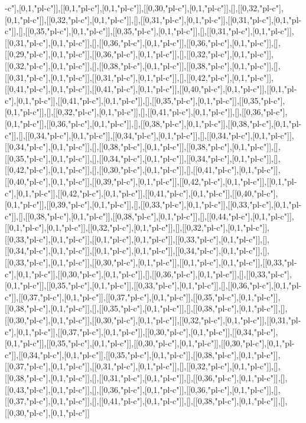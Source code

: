 -c"],[0,1,"pl-c"]],[[0,1,"pl-c"],[0,1,"pl-c"]],[[0,30,"pl-c"],[0,1,"pl-c"]],[],[[0,32,"pl-c"],[0,1,"pl-c"]],[[0,32,"pl-c"],[0,1,"pl-c"]],[],[[0,31,"pl-c"],[0,1,"pl-c"]],[[0,31,"pl-c"],[0,1,"pl-c"]],[],[[0,35,"pl-c"],[0,1,"pl-c"]],[[0,35,"pl-c"],[0,1,"pl-c"]],[],[[0,31,"pl-c"],[0,1,"pl-c"]],[[0,31,"pl-c"],[0,1,"pl-c"]],[],[[0,36,"pl-c"],[0,1,"pl-c"]],[[0,36,"pl-c"],[0,1,"pl-c"]],[],[[0,29,"pl-c"],[0,1,"pl-c"]],[[0,36,"pl-c"],[0,1,"pl-c"]],[],[[0,32,"pl-c"],[0,1,"pl-c"]],[[0,32,"pl-c"],[0,1,"pl-c"]],[],[[0,38,"pl-c"],[0,1,"pl-c"]],[[0,38,"pl-c"],[0,1,"pl-c"]],[],[[0,31,"pl-c"],[0,1,"pl-c"]],[[0,31,"pl-c"],[0,1,"pl-c"]],[],[[0,42,"pl-c"],[0,1,"pl-c"]],[[0,41,"pl-c"],[0,1,"pl-c"]],[[0,41,"pl-c"],[0,1,"pl-c"]],[[0,40,"pl-c"],[0,1,"pl-c"]],[[0,1,"pl-c"],[0,1,"pl-c"]],[[0,41,"pl-c"],[0,1,"pl-c"]],[],[[0,35,"pl-c"],[0,1,"pl-c"]],[[0,35,"pl-c"],[0,1,"pl-c"]],[],[[0,32,"pl-c"],[0,1,"pl-c"]],[],[[0,41,"pl-c"],[0,1,"pl-c"]],[],[[0,36,"pl-c"],[0,1,"pl-c"]],[[0,36,"pl-c"],[0,1,"pl-c"]],[],[[0,38,"pl-c"],[0,1,"pl-c"]],[[0,38,"pl-c"],[0,1,"pl-c"]],[],[[0,34,"pl-c"],[0,1,"pl-c"]],[[0,34,"pl-c"],[0,1,"pl-c"]],[],[[0,34,"pl-c"],[0,1,"pl-c"]],[[0,34,"pl-c"],[0,1,"pl-c"]],[],[[0,38,"pl-c"],[0,1,"pl-c"]],[[0,38,"pl-c"],[0,1,"pl-c"]],[],[[0,35,"pl-c"],[0,1,"pl-c"]],[],[[0,34,"pl-c"],[0,1,"pl-c"]],[[0,34,"pl-c"],[0,1,"pl-c"]],[],[[0,42,"pl-c"],[0,1,"pl-c"]],[],[[0,30,"pl-c"],[0,1,"pl-c"]],[],[[0,41,"pl-c"],[0,1,"pl-c"]],[[0,40,"pl-c"],[0,1,"pl-c"]],[[0,39,"pl-c"],[0,1,"pl-c"]],[[0,42,"pl-c"],[0,1,"pl-c"]],[[0,1,"pl-c"],[0,1,"pl-c"]],[[0,42,"pl-c"],[0,1,"pl-c"]],[[0,41,"pl-c"],[0,1,"pl-c"]],[[0,40,"pl-c"],[0,1,"pl-c"]],[[0,39,"pl-c"],[0,1,"pl-c"]],[],[[0,33,"pl-c"],[0,1,"pl-c"]],[[0,33,"pl-c"],[0,1,"pl-c"]],[],[[0,38,"pl-c"],[0,1,"pl-c"]],[[0,38,"pl-c"],[0,1,"pl-c"]],[],[[0,44,"pl-c"],[0,1,"pl-c"]],[[0,1,"pl-c"],[0,1,"pl-c"]],[[0,32,"pl-c"],[0,1,"pl-c"]],[],[[0,32,"pl-c"],[0,1,"pl-c"]],[[0,33,"pl-c"],[0,1,"pl-c"]],[[0,1,"pl-c"],[0,1,"pl-c"]],[[0,33,"pl-c"],[0,1,"pl-c"]],[],[[0,34,"pl-c"],[0,1,"pl-c"]],[[0,1,"pl-c"],[0,1,"pl-c"]],[[0,34,"pl-c"],[0,1,"pl-c"]],[],[[0,33,"pl-c"],[0,1,"pl-c"]],[[0,30,"pl-c"],[0,1,"pl-c"]],[[0,1,"pl-c"],[0,1,"pl-c"]],[[0,33,"pl-c"],[0,1,"pl-c"]],[[0,30,"pl-c"],[0,1,"pl-c"]],[],[[0,36,"pl-c"],[0,1,"pl-c"]],[],[[0,33,"pl-c"],[0,1,"pl-c"]],[[0,35,"pl-c"],[0,1,"pl-c"]],[[0,33,"pl-c"],[0,1,"pl-c"]],[],[[0,36,"pl-c"],[0,1,"pl-c"]],[[0,37,"pl-c"],[0,1,"pl-c"]],[[0,37,"pl-c"],[0,1,"pl-c"]],[[0,35,"pl-c"],[0,1,"pl-c"]],[[0,38,"pl-c"],[0,1,"pl-c"]],[],[[0,35,"pl-c"],[0,1,"pl-c"]],[],[[0,38,"pl-c"],[0,1,"pl-c"]],[],[[0,30,"pl-c"],[0,1,"pl-c"]],[[0,30,"pl-c"],[0,1,"pl-c"]],[[0,32,"pl-c"],[0,1,"pl-c"]],[[0,31,"pl-c"],[0,1,"pl-c"]],[[0,37,"pl-c"],[0,1,"pl-c"]],[[0,30,"pl-c"],[0,1,"pl-c"]],[[0,34,"pl-c"],[0,1,"pl-c"]],[[0,35,"pl-c"],[0,1,"pl-c"]],[[0,30,"pl-c"],[0,1,"pl-c"]],[[0,30,"pl-c"],[0,1,"pl-c"]],[[0,34,"pl-c"],[0,1,"pl-c"]],[[0,35,"pl-c"],[0,1,"pl-c"]],[[0,38,"pl-c"],[0,1,"pl-c"]],[[0,37,"pl-c"],[0,1,"pl-c"]],[[0,31,"pl-c"],[0,1,"pl-c"]],[],[[0,32,"pl-c"],[0,1,"pl-c"]],[],[[0,38,"pl-c"],[0,1,"pl-c"]],[],[[0,31,"pl-c"],[0,1,"pl-c"]],[],[[0,36,"pl-c"],[0,1,"pl-c"]],[],[[0,43,"pl-c"],[0,1,"pl-c"]],[],[[0,36,"pl-c"],[0,1,"pl-c"]],[[0,36,"pl-c"],[0,1,"pl-c"]],[],[[0,37,"pl-c"],[0,1,"pl-c"]],[],[[0,41,"pl-c"],[0,1,"pl-c"]],[],[[0,38,"pl-c"],[0,1,"pl-c"]],[],[[0,30,"pl-c"],[0,1,"pl-c"]]